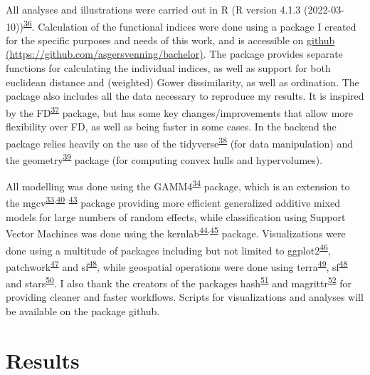 \documentclass[
  10pt,
]{article}
\begin{document}
All analyses and illustrations were carried out in R (R version 4.1.3 (2022-03-10))\textsuperscript{\protect\hyperlink{ref-R-base}{36}}. Calculation of the functional indices were done using a package I created for the specific purposes and needs of this work, and is accessible on \href{https://github.com/asgersvenning/bachelor}{github (https://github.com/asgersvenning/bachelor)}. The package provides separate functions for calculating the individual indices, as well as support for both euclidean distance and (weighted) Gower dissimilarity, as well as ordination. The package also includes all the data necessary to reproduce my results. It is inspired by the FD\textsuperscript{\protect\hyperlink{ref-R-FD-2}{37}} package, but has some key changes/improvements that allow more flexibility over FD, as well as being faster in some cases. In the backend the package relies heavily on the use of the tidyverse\textsuperscript{\protect\hyperlink{ref-R-tidyverse}{38}} (for data manipulation) and the geometry\textsuperscript{\protect\hyperlink{ref-R-geometry}{39}} package (for computing convex hulls and hypervolumes).

All modelling was done using the GAMM4\textsuperscript{\protect\hyperlink{ref-R-gamm4}{34}} package, which is an extension to the mgcv\textsuperscript{\protect\hyperlink{ref-R-mgcv-5}{33},\protect\hyperlink{ref-R-mgcv-1}{40}--\protect\hyperlink{ref-R-mgcv-4}{43}} package providing more efficient generalized additive mixed models for large numbers of random effects, while classification using Support Vector Machines was done using the kernlab\textsuperscript{\protect\hyperlink{ref-R-kernlab-1}{44},\protect\hyperlink{ref-R-kernlab-2}{45}} package. Visualizations were done using a multitude of packages including but not limited to ggplot2\textsuperscript{\protect\hyperlink{ref-R-ggplot2}{46}}, patchwork\textsuperscript{\protect\hyperlink{ref-R-patchwork}{47}} and sf\textsuperscript{\protect\hyperlink{ref-R-sf}{48}}, while geospatial operations were done using terra\textsuperscript{\protect\hyperlink{ref-R-terra}{49}}, sf\textsuperscript{\protect\hyperlink{ref-R-sf}{48}} and stars\textsuperscript{\protect\hyperlink{ref-R-stars}{50}}. I also thank the creators of the packages hash\textsuperscript{\protect\hyperlink{ref-R-hash}{51}} and magrittr\textsuperscript{\protect\hyperlink{ref-R-magrittr}{52}} for providing cleaner and faster workflows. Scripts for visualizations and analyses will be available on the package github.

\newpage

\hypertarget{results}{%
\section{Results}\label{results}}
\end{document}
